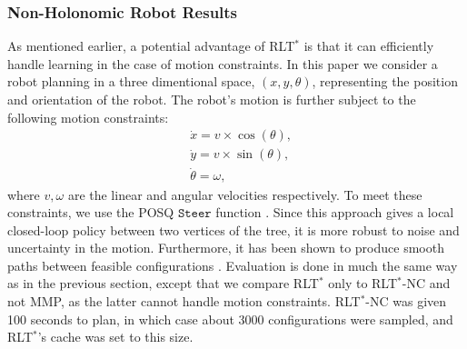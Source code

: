 \documentclass[letterpaper, 10 pt, conference]{ieeeconf}
\begin{document}
  \subsubsection{Non-Holonomic Robot Results}
  As mentioned earlier, a potential advantage of RLT$^*$ is that it can efficiently handle learning in the case of motion constraints. In this paper we consider a robot planning in a three dimentional space, $(x,y,\theta)$, representing the position and orientation of the robot. The robot's motion is further subject to the following motion constraints:
%
  \begin{align}
  	&\dot{x} = v\times\cos(\theta),\\
  	&\dot{y} = v\times\sin(\theta),\\
  	&\dot{\theta} = \omega,
  \end{align}
  where $v,\omega$ are the linear and angular velocities respectively.
  To meet these constraints, we use the POSQ $\texttt{Steer}$ function \cite{palmieri2014novel}.  Since this approach gives a local closed-loop policy between two vertices of the tree, it is  more robust to noise and uncertainty in the motion. Furthermore, it has been shown to produce smooth paths between feasible configurations \cite{palmieri2014novel}. Evaluation is done in much the same way as in the previous section, except that we compare RLT$^*$ only to RLT$^*$-NC and not MMP, as the latter cannot handle motion constraints.
RLT$^*$-NC was given 100 seconds to plan, in which case about 3000 configurations were sampled, and RLT$^*$'s cache was set to this size. 
\end{document}
